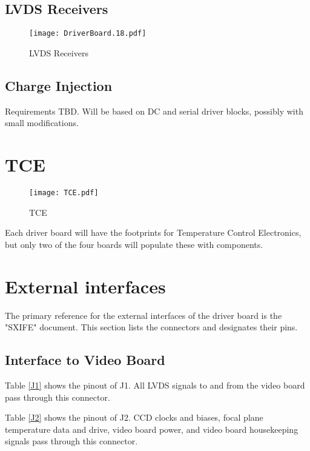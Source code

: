 \documentclass[a4paper,12pt]{article}
\begin{document}
\subsection{LVDS Receivers}
   \begin{figure}
   \begin{center}
   \texttt{[image: DriverBoard.18.pdf]}
   \end{center}
   \caption{LVDS Receivers}
   \end{figure}



\subsection{Charge Injection}

Requirements TBD. Will be based on DC and serial driver blocks, possibly with small modifications.

\section{TCE}

   \begin{figure}
   \begin{center}
   \texttt{[image: TCE.pdf]}
   \end{center}
   \caption{TCE}
   \end{figure}


Each driver board will have the footprints for Temperature Control Electronics, but only two of the four boards will populate these with components.

\section{External interfaces}

The primary reference for the external interfaces of the driver board is the "SXIFE" document. This section lists the connectors and designates their pins.

\subsection{Interface to Video Board}

Table \ref{J1} shows the pinout of J1. All LVDS signals to and from the video board pass through this connector.

Table \ref{J2} shows the pinout of J2. CCD clocks and biases, focal plane temperature data and drive, video board power, and video board housekeeping signals pass through this connector.
\end{document}
